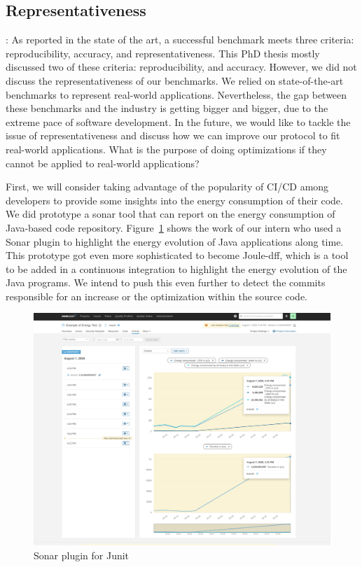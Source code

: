\subsection*{Representativeness}:
As reported in the state of the art, a successful benchmark meets three criteria: reproducibility, accuracy, and representativeness.
This PhD thesis mostly discussed two of these criteria: reproducibility, and accuracy.
However, we did not discuss the representativeness of our benchmarks.
We relied on state-of-the-art benchmarks to represent real-world applications.
Nevertheless, the gap between these benchmarks and the industry is getting bigger and bigger, due to the extreme pace of software development.
In the future, we would like to tackle the issue of representativeness and discuss how we can improve our protocol to fit real-world applications.
What is the purpose of doing optimizations if they cannot be applied to real-world applications?

First, we will consider taking advantage of the popularity of CI/CD among developers to provide some insights into the energy consumption of their code.
We did prototype a sonar tool that can report on the energy consumption of Java-based code repository.
Figure~\ref{fig:JunitSonarplugin} shows the work of our intern who used a Sonar plugin to highlight the energy evolution of Java applications along time.
This prototype got even more sophisticated to become Joule-dff, which is a tool to be added in a continuous integration to highlight the energy evolution of the Java programs.
We intend to push this even further to detect the commits responsible for an increase or the optimization within the source code.

\begin{figure}[!h]
      \centering
      \includegraphics[width=0.8\linewidth]{chapters/JunitSonarplugin}
      \caption{Sonar plugin for Junit}
      \label{fig:JunitSonarplugin}
\end{figure}



